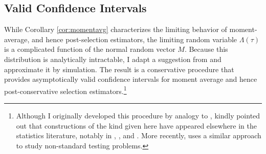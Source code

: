 \documentclass[12pt]{article}
\theoremstyle{definition}
\begin{document}

\subsection{Valid Confidence Intervals}
While Corollary \ref{cor:momentavg} characterizes the limiting behavior of moment-average, and hence post-selection estimators, the limiting random variable $\Lambda(\tau)$ is a complicated function of the normal random vector $M$. 
Because this distribution is analytically intractable, I adapt a suggestion from \cite{ClaeskensHjortbook} and approximate it by simulation.
The result is a conservative procedure that provides asymptotically valid confidence intervals for moment average and hence post-conservative selection estimators.\footnote{Although I originally developed this procedure by analogy to \cite{ClaeskensHjortbook}, \cite{Leeb} kindly pointed out that constructions of the kind given here have appeared elsewhere in the statistics literature, notably in \cite{Loh1985}, \cite{Berger1994}, and \cite{Silvapulle1996}. 
More recently, \cite{McCloskey} uses a similar approach to study non-standard testing problems.}
 
\end{document}

